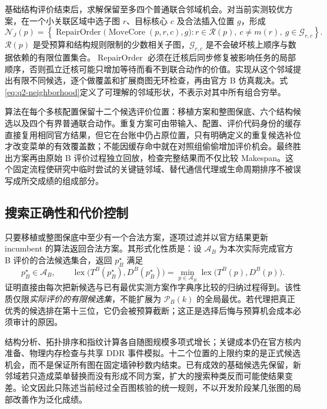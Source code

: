 基础结构评价结束后，求解保留至多四个普通联合邻域机会。对当前实测较优方案，在一个小关联区域中选子图 $r$、目标核心 $c$ 及合法插入位置 $g$，形成
\begin{equation}\label{eq:q2-neighborhood}
\mathcal N_J(p)=
\left\{
\operatorname{RepairOrder}\bigl(\operatorname{MoveCore}(p,r,c),g\bigr)
:r\in\mathcal R(p),\ c\ne m(r),\ g\in\mathcal G_{r,c}
\right\}.
\end{equation}
$\mathcal R(p)$ 是受预算和结构规则限制的少数相关子图，$\mathcal G_{r,c}$ 是不会破坏核上顺序与数据依赖的有限位置集合。$\operatorname{RepairOrder}$ 必须在迁核后同步修复被影响任务的局部顺序，否则孤立迁核可能只增加等待而看不到联合动作的价值。实现从这个邻域提出有限不同候选，逐个做覆盖和扩展商图无环检查，再由官方 B 仿真裁决。式\eqref{eq:q2-neighborhood}定义了可理解的邻域形状，不表示对其中所有组合穷举。

算法在每个多核配置保留十二个候选评价位置：移植方案和整图保底、六个结构候选以及四个有界普通联合动作。重复方案可由带输入、配置、评价代码身份的缓存直接复用相同官方结果，但它在台账中仍占原位置，只有明确定义的重复候选补位才改变菜单的有效覆盖数；不能因缓存命中就在对照组偷偷增加评价机会。最终胜出方案再由原始 B 评价过程独立回放，检查完整结果而不仅比较 Makespan。这个固定流程使研究中临时尝试的关键链邻域、替代通信代理或生命周期排序不被误写成所交成绩的组成部分。

\subsection{搜索正确性和代价控制}
只要移植或整图保底中至少有一个合法方案，逐项过滤并以官方结果更新 incumbent 的算法返回合法方案。其形式化性质是：设 $\mathcal A_B$ 为本次实际完成官方 B 评价的合法候选集合，返回 $p_B^\star$ 满足
\begin{equation}\label{eq:q2-finite-optimality}
p_B^\star\in\mathcal A_B,\qquad
\operatorname{lex}\bigl(T^B(p_B^\star),D^B(p_B^\star)\bigr)
=\min_{p\in\mathcal A_B}
\operatorname{lex}\bigl(T^B(p),D^B(p)\bigr).
\end{equation}
证明直接由每次把新候选与已有最优实测方案作字典序比较的归纳过程得到。该性质仅限\emph{实际评价的有限候选集}，不能扩展为 $\mathcal P_B(k)$ 的全局最优。若代理把真正优秀的候选排在第十三位，它仍会被预算截断；这正是选择后悔与预算机会成本必须审计的原因。

结构分析、拓扑排序和指纹计算各自随图规模多项式增长；关键成本仍在官方核内准备、物理内存检查与共享 DDR 事件模拟。十二个位置的上限约束的是正式候选机会，而不是保证所有图在固定墙钟秒数内结束。已有成效的基础候选先保留，新邻域若只造成菜单替换而没有形成不同方案，扩大的搜索种类反而可能使结果变差。论文因此只陈述当前经过全百图核验的统一规则，不以开发阶段某几张图的局部改善作为泛化成绩。
